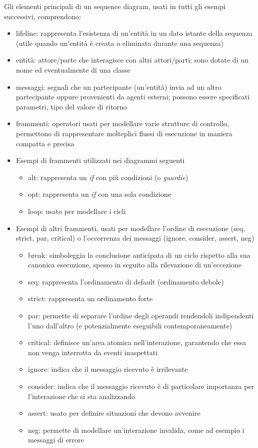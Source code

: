Gli elementi principali di un sequence diagram, usati in tutti gli esempi successivi, comprendono:
\begin{itemize}
\item lifeline: rappresenta l'esistenza di un'entità in un dato istante della sequenza (utile quando un'entità è creata o eliminata durante una sequenza)
\item entità: attore/parte che interagisce con altri attori/parti; sono dotate di un nome ed eventualmente di una classe
\item messaggi: segnali che un partecipante (un'entità) invia ad un altro partecipante oppure provenienti da agenti esterni; possono essere specificati parametri, tipo del valore di ritorno
\item frammenti: operatori usati per modellare varie strutture di controllo, permettono di rappresentare molteplici flussi di esecuzione in maniera compatta e precisa
\item Esempi di frammenti utilizzati nei diagrammi seguenti
\begin{itemize}
    \item alt: rappresenta un \textit{if} con più condizioni (o \textit{guardie})
    \item opt: rappresenta un \textit{if} con una sola condizione
    \item loop: usato per modellare i cicli
\end{itemize}
\item Esempi di altri frammenti, usati per modellare l'ordine di esecuzione (seq, strict, par, critical) o l'occorrenza dei messaggi (ignore, consider, assert, neg)
\begin{itemize}
\item break: simboleggia la conclusione anticipata di un ciclo rispetto alla sua canonica esecuzione, spesso in seguito alla rilevazione di un'eccezione
\item seq: rappresenta l'ordinamento di default (ordinamento debole)
\item strict: rappresenta un ordinamento forte
\item par: permette di separare l'ordine degli operandi rendendoli indipendenti l'uno dall'altro (e potenzialmente eseguibili contemporaneamente)
\item critical: definisce un'area atomica nell'interazione, garantendo che essa non venga interrotta da eventi inaspettati
\item ignore: indica che il messaggio ricevuto è irrilevante
\item consider: indica che il messaggio ricevuto è di particolare importanza per l'interazione che si sta analizzando
\item assert: usato per definire situazioni che devono avvenire
\item neg: permette di modellare un'interazione invalida, come ad esempio i messaggi di errore
\end{itemize}
\end{itemize}

